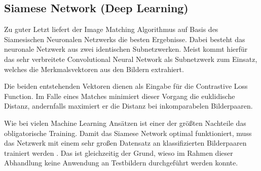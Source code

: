 \subsection{Siamese Network (Deep Learning)}
Zu guter Letzt liefert der Image Matching Algorithmus auf Basis des Siamesischen
Neuronalen Netzwerks die besten Ergebnisse. Dabei besteht das neuronale Netzwerk
aus zwei identischen Subnetzwerken. Meist kommt hierfür das sehr verbreitete
Convolutional Neural Network als Subnetzwerk zum Einsatz, welches die
Merkmalsvektoren aus den Bildern extrahiert. \parencite{siamese-orig-paper}

Die beiden entstehenden Vektoren dienen als Eingabe für die Contrastive Loss
Function. Im Falle eines Matches minimiert dieser Vorgang die euklidische
Distanz, andernfalls maximiert er die Distanz bei inkomparabelen Bilderpaaren.
\parencite{siamese-orig-paper}

Wie bei vielen Machine Learning Ansätzen ist einer der größten Nachteile das
obligatorische Training. Damit das Siamese Network optimal funktioniert, muss
das Netzwerk mit einem sehr großen Datensatz an klassifizierten Bilderpaaren
trainiert werden \parencite{mse-naive-approach}. Das ist gleichzeitig der Grund,
wieso im Rahmen dieser Abhandlung keine Anwendung an Testbildern durchgeführt
werden konnte.
